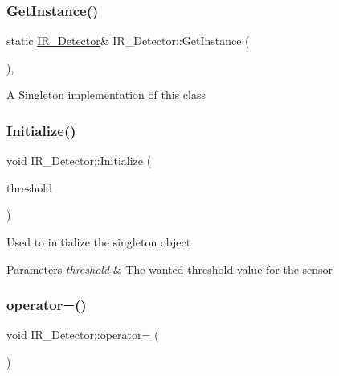 \subsubsection{\texorpdfstring{Get\+Instance()}{GetInstance()}}
{\footnotesize\ttfamily static \hyperlink{class_i_r___detector}{I\+R\+\_\+\+Detector}\& I\+R\+\_\+\+Detector\+::\+Get\+Instance (\begin{DoxyParamCaption}{ }\end{DoxyParamCaption})\hspace{0.3cm}{\ttfamily [inline]}, {\ttfamily [static]}}

A Singleton implementation of this class \hypertarget{class_i_r___detector_ae42dc3f8e68efc44e95b3931347b3a2c}{}\label{class_i_r___detector_ae42dc3f8e68efc44e95b3931347b3a2c} 
\subsubsection{\texorpdfstring{Initialize()}{Initialize()}}
{\footnotesize\ttfamily void I\+R\+\_\+\+Detector\+::\+Initialize (\begin{DoxyParamCaption}\item[{uint16\+\_\+t}]{threshold }\end{DoxyParamCaption})}

Used to initialize the singleton object 
\begin{DoxyParams}{Parameters}
{\em threshold} & The wanted threshold value for the sensor \\
\hline
\end{DoxyParams}
\hypertarget{class_i_r___detector_a8359f3a2fdc9cee0e1bc8da50b5de4e0}{}\label{class_i_r___detector_a8359f3a2fdc9cee0e1bc8da50b5de4e0} 
\subsubsection{\texorpdfstring{operator=()}{operator=()}}
{\footnotesize\ttfamily void I\+R\+\_\+\+Detector\+::operator= (\begin{DoxyParamCaption}\item[{const \hyperlink{class_i_r___detector}{I\+R\+\_\+\+Detector} \&}]{ }\end{DoxyParamCaption})\hspace{0.3cm}{\ttfamily [delete]}}

